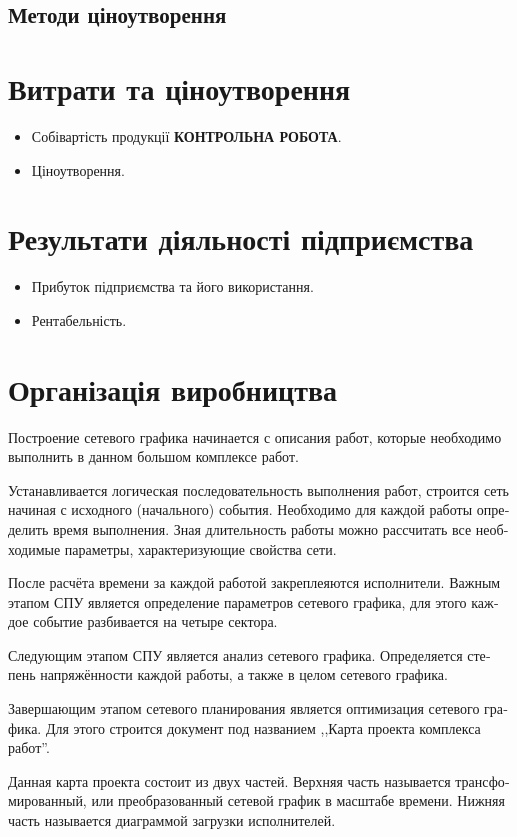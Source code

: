 \documentclass[a5paper,10pt,notitlepage,pdftex,headsepline]{scrartcl}
\begin{document}
  \subsection{Методи ціноутворення}

\section{Витрати та ціноутворення}
  \begin{itemize}
    \item Собівартість продукції \textbf{КОНТРОЛЬНА РОБОТА}.
    \item Ціноутворення.
  \end{itemize}
\section{Результати діяльності підприємства}
  \begin{itemize}
    \item Прибуток підприємства та його використання.
    \item Рентабельність.
  \end{itemize}
\section{Організація виробництва}
  \begin{otherlanguage}{russian}
    Построение сетевого графика начинается с описания работ, которые необходимо
    выполнить в данном большом комплексе работ.

    Устанавливается логическая последовательность выполнения работ, строится
    сеть начиная с исходного (начального) события.
    Необходимо для каждой работы определить время выполнения.
    Зная длительность работы можно рассчитать все необходимые параметры,
    характеризующие свойства сети.

    После расчёта времени за каждой работой закреплеяются исполнители.
    Важным этапом СПУ является определение параметров сетевого графика, для
    этого каждое событие разбивается на четыре сектора.

    Следующим этапом СПУ является анализ сетевого графика.
    Определяется степень напряжённости каждой работы, а также в целом сетевого
    графика.

    Завершающим этапом сетевого планирования является оптимизация сетевого
    графика.
    Для этого строится документ под названием ,,Карта проекта комплекса работ''.

    Данная карта проекта состоит из двух частей.
    Верхняя часть называется трансфомированный, или преобразованный сетевой
    график в масштабе времени.
    Нижняя часть называется диаграммой загрузки исполнителей.
  \end{otherlanguage}
\end{document}
